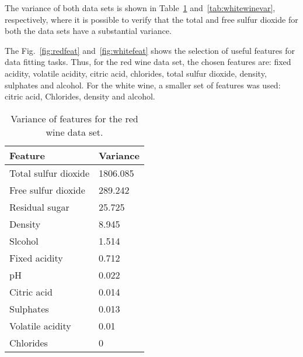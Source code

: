 The variance of both data sets is shown in Table~\ref{tab:redwinevar} and~\ref{tab:whitewinevar}, respectively, where it is possible to verify that the total and free sulfur dioxide for both the data sets have a substantial variance.

The Fig.~\ref{fig:redfeat} and~\ref{fig:whitefeat} shows the selection of useful features for data fitting tasks. Thus, for the red wine data set, the chosen features are:  fixed acidity, volatile acidity, citric acid, chlorides, total sulfur dioxide, density, sulphates and alcohol. For the white wine, a smaller set of features was used: citric acid, Chlorides, density and alcohol.

\begin{table}[htbp]
    \centering
    \caption{Variance of features for the red wine data set.}
    \label{tab:redwinevar}
    \begin{tabular}{|l|l|}
    \hline
         \textbf{Feature} & \textbf{Variance}\\ \hline
Total sulfur dioxide & 1806.085 \\ \hline
Free sulfur dioxide & 289.242 \\ \hline
Residual sugar   & 25.725 \\ \hline
Density & 8.945 \\ \hline
Slcohol & 1.514 \\ \hline
Fixed acidity & 0.712 \\ \hline
pH & 0.022 \\ \hline
Citric acid & 0.014 \\ \hline
Sulphates & 0.013 \\ \hline
Volatile acidity & 0.01 \\ \hline
Chlorides & 0 \\ \hline

    \end{tabular}
    
\end{table}



